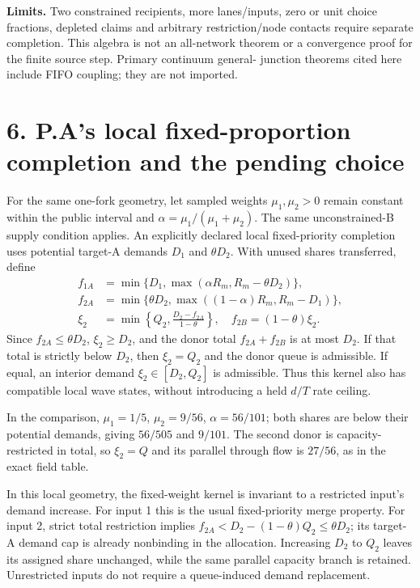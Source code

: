\documentclass[11pt,a4paper]{article}
\begin{document}
\textbf{Limits.} Two constrained recipients, more lanes/inputs, zero or
unit choice fractions, depleted claims and arbitrary restriction/node contacts
require separate completion. This algebra is not an all-network theorem or
a convergence proof for the finite source step. Primary continuum general-
junction theorems cited here include FIFO coupling; they are not imported.

\newpage
\section*{6. P.A's local fixed-proportion completion and the pending choice}
For the same one-fork geometry, let sampled weights $\mu_1,\mu_2>0$ remain
constant within the public interval and $\alpha=\mu_1/(\mu_1+\mu_2)$.
The same unconstrained-B supply condition applies.
An explicitly declared local fixed-priority completion uses potential target-A
demands $D_1$ and $\theta D_2$. With unused shares transferred, define
\begin{align}
 f_{1A}&=\min\{D_1,\max(\alpha R_m,R_m-\theta D_2)\},\\
 f_{2A}&=\min\{\theta D_2,\max((1-\alpha)R_m,R_m-D_1)\},\\
 \xi_2&=\min\left\{Q_2,\frac{D_2-f_{2A}}{1-\theta}\right\},\quad
 f_{2B}=(1-\theta)\xi_2.
\end{align}
Since $f_{2A}\le\theta D_2$, $\xi_2\ge D_2$, and the donor total
$f_{2A}+f_{2B}$ is at most $D_2$. If that total is strictly below $D_2$,
then $\xi_2=Q_2$ and the donor queue is admissible. If equal, an interior
demand $\xi_2\in[D_2,Q_2]$ is admissible. Thus this kernel also has compatible
local wave states, without introducing a held $d/T$ rate ceiling.

In the comparison, $\mu_1=1/5$, $\mu_2=9/56$, $\alpha=56/101$;
both shares are below their potential demands, giving $56/505$ and $9/101$.
The second donor is capacity-restricted in total, so $\xi_2=Q$ and its
parallel through flow is $27/56$, as in the exact field table.

In this local geometry, the fixed-weight kernel is invariant to a restricted
input's demand increase. For input 1 this is the usual fixed-priority merge
property. For input 2, strict total restriction implies
$f_{2A}<D_2-(1-\theta)Q_2\le\theta D_2$; its target-A demand cap is already
nonbinding in the allocation. Increasing $D_2$ to $Q_2$ leaves its assigned
share unchanged, while the same parallel capacity branch is retained.
Unrestricted inputs do not require a queue-induced demand replacement.
\end{document}

